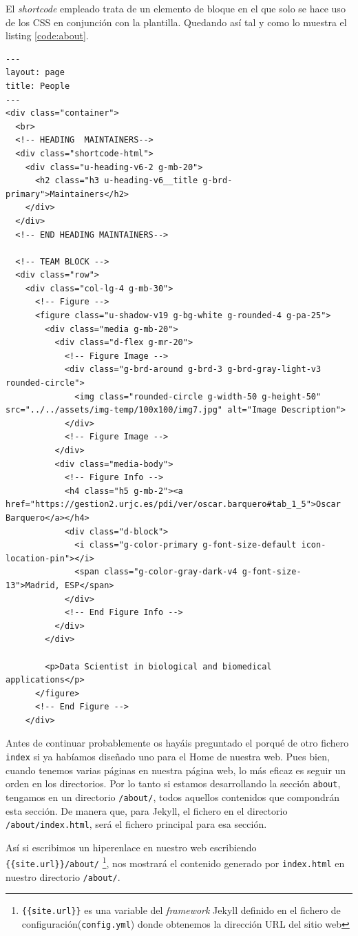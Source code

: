 El \textit{shortcode} empleado trata de un elemento de bloque en el que solo se hace uso de los CSS en conjunción con la plantilla. Quedando así tal y como lo muestra el listing \ref{code:about}. 
\begin{lstlisting}[style=htmlcssjs,caption=index.html de About,label={code:about}]
---
layout: page
title: People
---
<div class="container">
  <br>
  <!-- HEADING  MAINTAINERS-->
  <div class="shortcode-html">
    <div class="u-heading-v6-2 g-mb-20">
      <h2 class="h3 u-heading-v6__title g-brd-primary">Maintainers</h2>
    </div>
  </div>
  <!-- END HEADING MAINTAINERS-->

  <!-- TEAM BLOCK -->
  <div class="row">
    <div class="col-lg-4 g-mb-30">
      <!-- Figure -->
      <figure class="u-shadow-v19 g-bg-white g-rounded-4 g-pa-25">
        <div class="media g-mb-20">
          <div class="d-flex g-mr-20">
            <!-- Figure Image -->
            <div class="g-brd-around g-brd-3 g-brd-gray-light-v3 rounded-circle">
              <img class="rounded-circle g-width-50 g-height-50" src="../../assets/img-temp/100x100/img7.jpg" alt="Image Description">
            </div>
            <!-- Figure Image -->
          </div>
          <div class="media-body">
            <!-- Figure Info -->
            <h4 class="h5 g-mb-2"><a href="https://gestion2.urjc.es/pdi/ver/oscar.barquero#tab_1_5">Oscar Barquero</a></h4>
            <div class="d-block">
              <i class="g-color-primary g-font-size-default icon-location-pin"></i>
              <span class="g-color-gray-dark-v4 g-font-size-13">Madrid, ESP</span>
            </div>
            <!-- End Figure Info -->
          </div>
        </div>

        <p>Data Scientist in biological and biomedical applications</p>
      </figure>
      <!-- End Figure -->
    </div>
\end{lstlisting}

Antes de continuar probablemente os hayáis preguntado el porqué de otro fichero \texttt{index} si ya habíamos diseñado uno para el Home de nuestra web. Pues bien,  cuando tenemos varias páginas en nuestra página web, lo más eficaz es seguir un orden en los directorios. Por lo tanto si estamos desarrollando la sección \texttt{about}, tengamos en un directorio \texttt{/about/}, todos aquellos contenidos que compondrán esta sección. De manera que, para Jekyll, el fichero en el directorio \texttt{/about/index.html}, será el fichero principal para esa sección.

Así si escribimos un hiperenlace en nuestro web escribiendo \texttt{\{\{site.url\}\}/about/} \footnote{\texttt{\{\{site.url\}\}} es una variable del \textit{framework} Jekyll definido en el fichero de configuración(\texttt{config.yml}) donde obtenemos la dirección URL del sitio web}, nos mostrará el contenido generado por \texttt{index.html} en nuestro directorio \texttt{/about/}.

